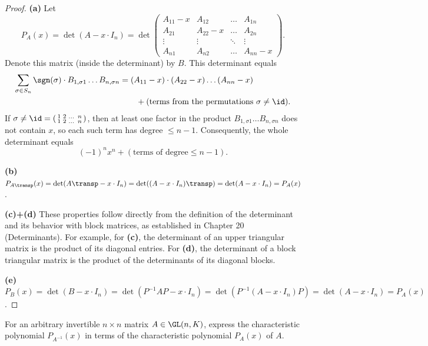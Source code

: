 \begin{proof}
  \textbf{(a)} Let
  \[P_A(x) = \det(A - x \cdot I_n) = \det\begin{pmatrix} A_{11}-x & A_{12} & \dots & A_{1n} \\ A_{21} & A_{22}-x & \dots & A_{2n} \\ \vdots & \vdots & \ddots & \vdots \\ A_{n1} & A_{n2} & \dots & A_{nn}-x \end{pmatrix}. \]
  Denote this matrix (inside the determinant) by $B$. This determinant equals
  \begin{align*}
    \sum_{\sigma \in S_n} \sgn(\sigma) \cdot B_{1, \sigma 1} \dots B_{n, \sigma n}
    & = (A_{11}-x) \cdot (A_{22}-x) \dots (A_{nn}-x) \\
    & \qquad + (\text{terms from the permutations } \sigma \ne \id).
  \end{align*}
  If $\sigma \ne \id = \left(\begin{smallmatrix} 1 & 2 & \dots & n \\ 1 & 2 & \dots & n \end{smallmatrix}\right)$, then at least one factor in the product $B_{1, \sigma 1} \dots B_{n, \sigma n}$ does not contain $x$, so each such term has degree $\le n-1$. Consequently, the whole determinant equals
  \[ (-1)^n x^n + (\text{terms of degree} \le n-1). \]

  \textbf{(b)} $P_{A\transp}(x) = \det(A\transp - x \cdot I_n) = \det((A - x \cdot I_n)\transp) = \det(A - x \cdot I_n) = P_A(x)$.

  \textbf{(c)+(d)} These properties follow directly from the definition of the determinant and its behavior with block matrices, as established in Chapter 20 (Determinants). For example, for \textbf{(c)}, the determinant of an upper triangular matrix is the product of its diagonal entries. For \textbf{(d)}, the determinant of a block triangular matrix is the product of the determinants of its diagonal blocks.

  \textbf{(e)} $P_B(x) = \det(B - x \cdot I_n) = \det(P^{-1}AP - x \cdot I_n) = \det(P^{-1}(A - x \cdot I_n)P) = \det(A - x \cdot I_n) = P_A(x)$.
\end{proof}

\begin{exercise}
  \label{exc:char_poly_inverse_matrix}
  For an arbitrary invertible $n \times n$ matrix $A \in \GL(n, K)$, express the characteristic polynomial $P_{A^{-1}}(x)$ in terms of the characteristic polynomial $P_A(x)$ of $A$.
\end{exercise}

